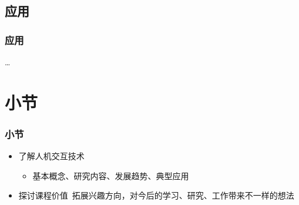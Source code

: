 \documentclass{beamer}
\begin{document}
\subsection{应用}
\begin{frame}
	\frametitle{应用}
	\dots
\end{frame}

\section{小节}
\begin{frame}
	\frametitle{小节}
	\begin{itemize}
		\item 了解人机交互技术
		\begin{itemize}
			\item {\small 基本概念、研究内容、发展趋势、典型应用}
		\end{itemize}
		\item 探讨课程价值~{\tiny 拓展兴趣方向，对今后的学习、研究、工作带来不一样的想法}
	\end{itemize}
\end{frame}



\end{document}
